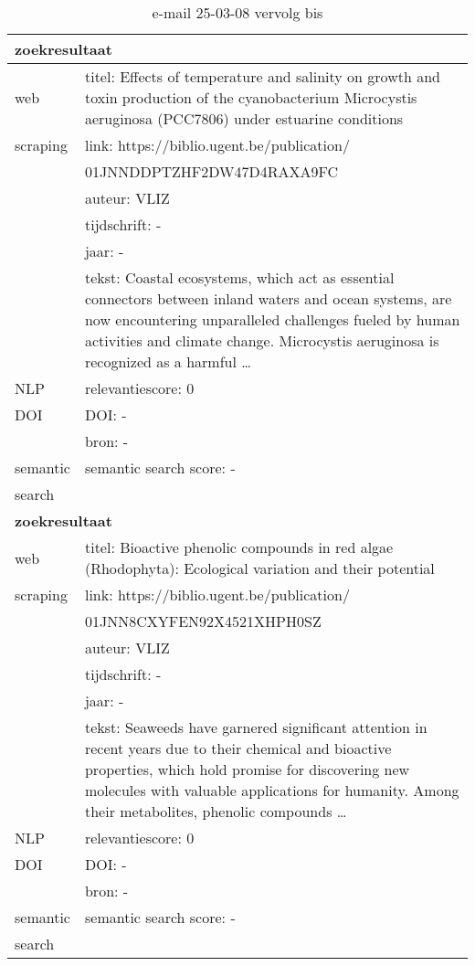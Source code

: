 \begin{table}[h!]
    \caption{e-mail 25-03-08 vervolg bis}
    \centering
    \begin{tabularx}{\textwidth}{|p{4cm}|X|} 
        \hline
        \multicolumn{2}{|X|}{\textbf{zoekresultaat}} \\
        \hline
        web &titel: Effects of temperature and salinity on growth and toxin production of the cyanobacterium Microcystis aeruginosa (PCC7806) under estuarine conditions\\
        scraping&link: https://biblio.ugent.be/publication/\\&01JNNDDPTZHF2DW47D4RAXA9FC\\
        &auteur: VLIZ\\
        &tijdschrift: -\\
        &jaar: -\\
        &tekst: Coastal ecosystems, which act as essential connectors between inland waters and ocean systems, are now encountering unparalleled challenges fueled by human activities and climate change. Microcystis aeruginosa is recognized as a harmful …\\
        \hline
        NLP&relevantiescore: 0\\
        \hline
        DOI&DOI: -\\
        &bron: -\\
        \hline
        semantic&semantic search score: -\\
        search&\\
        \hline
        \multicolumn{2}{|X|}{\textbf{zoekresultaat}} \\
        \hline
        web &titel: Bioactive phenolic compounds in red algae (Rhodophyta): Ecological variation and their potential\\
        scraping&link: https://biblio.ugent.be/publication/\\&01JNN8CXYFEN92X4521XHPH0SZ\\
        &auteur: VLIZ\\
        &tijdschrift: -\\
        &jaar: -\\
        &tekst: Seaweeds have garnered significant attention in recent years due to their chemical and bioactive properties, which hold promise for discovering new molecules with valuable applications for humanity. Among their metabolites, phenolic compounds …\\
        \hline
        NLP&relevantiescore: 0\\
        \hline
        DOI&DOI: -\\
        &bron: -\\
        \hline
        semantic&semantic search score: -\\
        search&\\
        \hline
    \end{tabularx}
    \label{table:email20250308vervolgbis}
\end{table}

